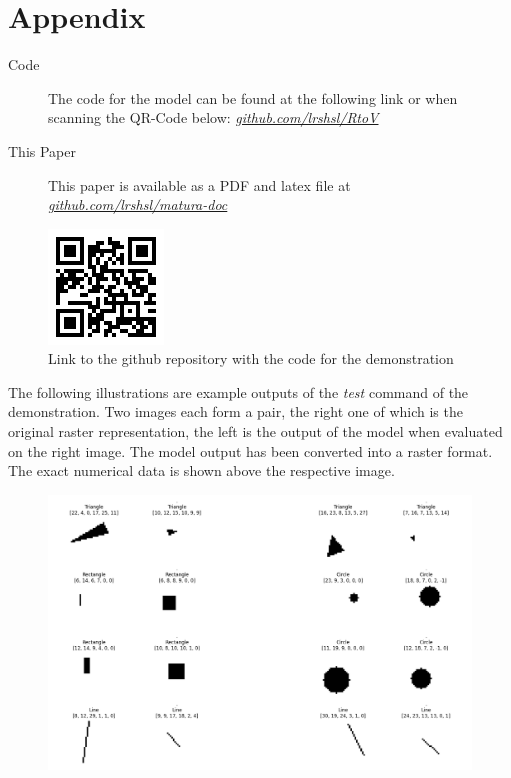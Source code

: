 \documentclass[12pt, a4paper, titlepage]{report}
\let\oldhref\href
\renewcommand{\href}[2]{\oldhref{#1}{\itshape#2}}
\begin{document}


\chapter{Appendix}

\begin{description}
   \item[Code] The code for the model can be found at the following link or when scanning the QR-Code below: \href{https://github.com/lrshsl/rtov.git}{github.com/lrshsl/RtoV}
   \item[This Paper] This paper is available as a PDF and latex file at \href{https://github.com/lrshsl/matura-doc/tree/main/matura_thesis}{github.com/lrshsl/matura-doc}
\end{description}


\begin{figure}[b]
   \centering
   \includegraphics{../rc/images/QrCode_LinkRepo.png}
   \caption{Link to the github repository with the code for the demonstration}
\end{figure}

\pagebreak

The following illustrations are example outputs of the \emph{test} command of the demonstration. Two images each form a pair, the right one of which is the original raster representation, the left is the output of the model when evaluated on the right image. The model output has been converted into a raster format. The exact numerical data is shown above the respective image.
\vspace{2cm}

\begin{figure}[H]
   \includegraphics[width=1.0\textwidth]{../rc/images/all_shapes_approx_visual1.png}
   \label{fig:results_demonstration1}
\end{figure}
\end{document}
